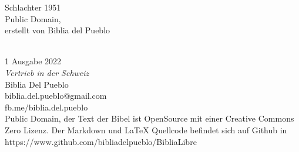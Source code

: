 Schlachter 1951\\
Public Domain,\\
erstellt von Biblia del Pueblo\\
\strut \\
1 Ausgabe 2022~\\
\emph{Vertrieb in der Schweiz}\\
Biblia Del Pueblo\\
biblia.del.pueblo@gmail.com\\
fb.me/biblia.del.pueblo~\\
Public Domain, der Text der Bibel ist OpenSource mit einer Creative
Commons Zero Lizenz. Der Markdown und LaTeX Quellcode befindet sich auf
Github in\\
https://www.github.com/bibliadelpueblo/BibliaLibre\\
